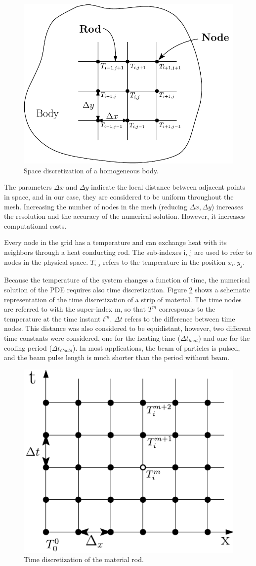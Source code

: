 \begin{figure}[h]
    \centering
    \includegraphics[width=0.5\columnwidth]{SpaceDiscretization/SpaceDiscretization.pdf}
    \caption{Space discretization of a homogeneous body.}
    \label{fig:SpaceDiscret}
\end{figure}

The parameters $\Delta x$ and $\Delta y$ indicate the local distance between adjacent points in space, and in our case, they are considered to be uniform throughout the mesh. Increasing the number of nodes in the mesh (reducing $\Delta x , \Delta y$) increases the resolution and the accuracy of the numerical solution. However, it increases computational costs.

Every node in the grid has a temperature and can exchange heat with its neighbors through a heat conducting rod. The sub-indexes i, j are used to refer to nodes in the physical space.  $T_{i,j}$ refers to the temperature in the position $x_i , y_j$.

Because the temperature of the system changes a function of time, the numerical solution of the PDE requires also time discretization. Figure \ref{fig:TimeDiscret} shows a schematic representation of the time discretization of a strip of material. The time nodes are referred to with the super-index m, so that $T^{m}$ corresponds to the temperature at the time instant  $t^m$.  $\Delta t$ refers to the difference between time nodes. This distance was also considered to be equidistant, however, two different time constants were considered, one for the heating time ($\Delta {t}_{heat}$) and one for the cooling period ($\Delta t_{Coold}$). In most applications, the beam of particles is pulsed, and the beam pulse length is much shorter than the period without beam. 

\begin{figure}[h]
    \centering
    \includegraphics[width=0.4\columnwidth]{TimeDiscretization/TimeDiscret.pdf}
    \caption{Time discretization of the material rod.}
    \label{fig:TimeDiscret}
\end{figure}

